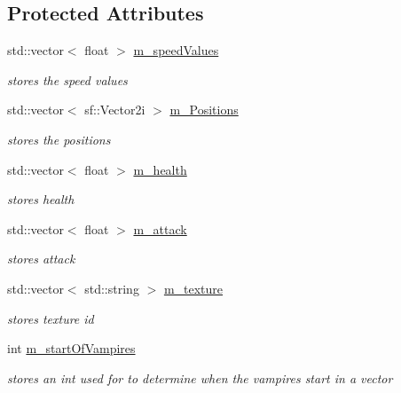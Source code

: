 \subsection*{Protected Attributes}
\begin{DoxyCompactItemize}
\item 
\mbox{\label{class_file_reader_a5a8ec51093ebc6e21a82a151e0672375}} 
std\+::vector$<$ float $>$ \mbox{\hyperlink{class_file_reader_a5a8ec51093ebc6e21a82a151e0672375}{m\+\_\+speed\+Values}}
\begin{DoxyCompactList}\small\item\em stores the speed values \end{DoxyCompactList}\item 
\mbox{\label{class_file_reader_a1987e0f71700746437cee5b9231d5cfe}} 
std\+::vector$<$ sf\+::\+Vector2i $>$ \mbox{\hyperlink{class_file_reader_a1987e0f71700746437cee5b9231d5cfe}{m\+\_\+\+Positions}}
\begin{DoxyCompactList}\small\item\em stores the positions \end{DoxyCompactList}\item 
\mbox{\label{class_file_reader_a4fc27357cabaa49c75dcb2d07617e4d4}} 
std\+::vector$<$ float $>$ \mbox{\hyperlink{class_file_reader_a4fc27357cabaa49c75dcb2d07617e4d4}{m\+\_\+health}}
\begin{DoxyCompactList}\small\item\em stores health \end{DoxyCompactList}\item 
\mbox{\label{class_file_reader_a48a65dfc7c279d5e5773f2bdf7a40f5c}} 
std\+::vector$<$ float $>$ \mbox{\hyperlink{class_file_reader_a48a65dfc7c279d5e5773f2bdf7a40f5c}{m\+\_\+attack}}
\begin{DoxyCompactList}\small\item\em stores attack \end{DoxyCompactList}\item 
\mbox{\label{class_file_reader_a7579fb5818df13d3f241bf22e46502b3}} 
std\+::vector$<$ std\+::string $>$ \mbox{\hyperlink{class_file_reader_a7579fb5818df13d3f241bf22e46502b3}{m\+\_\+texture}}
\begin{DoxyCompactList}\small\item\em stores texture id \end{DoxyCompactList}\item 
\mbox{\label{class_file_reader_ad5eb0b8736cea57b3823f50d8bf4929a}} 
int \mbox{\hyperlink{class_file_reader_ad5eb0b8736cea57b3823f50d8bf4929a}{m\+\_\+start\+Of\+Vampires}}
\begin{DoxyCompactList}\small\item\em stores an int used for to determine when the vampires start in a vector \end{DoxyCompactList}\end{DoxyCompactItemize}


